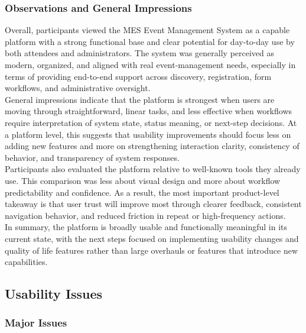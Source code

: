 \documentclass[12pt]{article}
\begin{document}
\subsubsection{Observations and General Impressions}

Overall, participants viewed the MES Event Management System as a capable platform with a strong functional base and clear potential for day-to-day use by both attendees and administrators. The system was generally perceived as modern, organized, and aligned with real event-management needs, especially in terms of providing end-to-end support across discovery, registration, form workflows, and administrative oversight.\\
General impressions indicate that the platform is strongest when users are moving through straightforward, linear tasks, and less effective when workflows require interpretation of system state, status meaning, or next-step decisions. At a platform level, this suggests that usability improvements should focus less on adding new features and more on strengthening interaction clarity, consistency of behavior, and transparency of system responses.\\
Participants also evaluated the platform relative to well-known tools they already use. This comparison was less about visual design and more about workflow predictability and confidence. As a result, the most important product-level takeaway is that user trust will improve most through clearer feedback, consistent navigation behavior, and reduced friction in repeat or high-frequency actions.\\
In summary, the platform is broadly usable and functionally meaningful in its current state, with the next steps focused on implementing usability changes and quality of life features rather than large overhauls or features that introduce new capabilities.

\subsection{Usability Issues}

\subsubsection{Major Issues}
\end{document}
